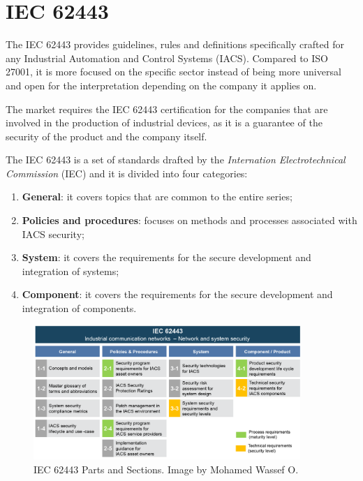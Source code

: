 \section{IEC 62443}

The IEC 62443 provides guidelines, rules and definitions specifically crafted for any Industrial Automation and Control Systems (IACS). Compared to ISO 27001, it is more focused on the specific sector instead of being more universal and open for the interpretation depending on the company it applies on.

The market requires the IEC 62443 certification for the companies that are involved in the production of industrial devices, as it is a guarantee of the security of the product and the company itself. 

The IEC 62443 is a set of standards drafted by the \textit{Internation Electrotechnical Commission} (IEC) and it is divided into four categories:~\cite{understanding-iec-62443-parts}
\begin{enumerate}
  \item \textbf{General}: it covers topics that are common to the entire series;
  \item \textbf{Policies and procedures}: focuses on methods and processes associated with IACS security;
  \item \textbf{System}: it covers the requirements for the secure development and integration of systems;
  \item \textbf{Component}: it covers the requirements for the secure development and integration of components.
\end{enumerate}

\begin{figure}[t]
  \centering
  \includegraphics[width=0.9\textwidth]{chapters/03/assets/iec62443.png}
  \caption[IEC 62443 Parts and Sections. Image by Mohamed Wassef O. \protect\footnotemark]{IEC 62443 Parts and Sections. Image by Mohamed Wassef O. \protect\footnotemark}
  \label{fig:iec-62443}
\end{figure}

